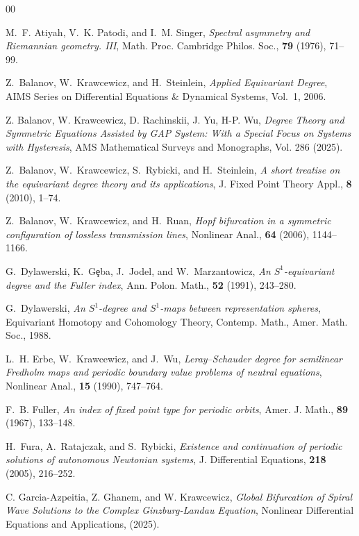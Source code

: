 \documentclass[twoside,11pt]{article}
\begin{document}
\begin{thebibliography}{00}

M.~F. Atiyah, V.~K. Patodi, and I.~M. Singer,
\emph{Spectral asymmetry and Riemannian geometry. III},
Math. Proc. Cambridge Philos. Soc., \textbf{79} (1976), 71--99.

Z.~Balanov, W.~Krawcewicz, and H.~Steinlein,
\emph{Applied Equivariant Degree},
AIMS Series on Differential Equations \& Dynamical Systems, Vol.~1, 2006.

 Z. Balanov, W. Krawcewicz,  D. Rachinskii, J. Yu, H-P. Wu, \emph{Degree Theory and Symmetric Equations Assisted by GAP System: With a Special Focus on Systems with Hysteresis}, AMS Mathematical Surveys and Monographs, Vol. 286 (2025).

Z.~Balanov, W.~Krawcewicz, S.~Rybicki, and H.~Steinlein, \emph{A short treatise on the equivariant degree theory and its applications},
J. Fixed Point Theory Appl., \textbf{8} (2010), 1--74.

Z.~Balanov, W.~Krawcewicz, and H.~Ruan,
\emph{Hopf bifurcation in a symmetric configuration of lossless transmission lines},
Nonlinear Anal., \textbf{64} (2006), 1144--1166.

G.~Dylawerski, K.~G\c{e}ba, J.~Jodel, and W.~Marzantowicz, \emph{An $S^1$-equivariant degree and the Fuller index},
Ann. Polon. Math., \textbf{52} (1991), 243--280.

G.~Dylawerski,
\emph{An $S^1$-degree and $S^1$-maps between representation spheres}, Equivariant Homotopy and Cohomology Theory, Contemp. Math., Amer. Math. Soc., 1988.

L.~H. Erbe, W.~Krawcewicz, and J.~Wu,
\emph{Leray--Schauder degree for semilinear Fredholm maps and periodic boundary value problems of neutral equations}, Nonlinear Anal., \textbf{15} (1990), 747--764.

F.~B. Fuller,
\emph{An index of fixed point type for periodic orbits}, Amer. J. Math., \textbf{89} (1967), 133--148.

H.~Fura, A.~Ratajczak, and S.~Rybicki,
\emph{Existence and continuation of periodic solutions of autonomous Newtonian systems},
J. Differential Equations, \textbf{218} (2005), 216--252.

C. Garcia-Azpeitia, Z. Ghanem, and W. Krawcewicz,
\emph{Global Bifurcation of Spiral Wave Solutions to the Complex Ginzburg-Landau Equation}, Nonlinear Differential Equations and Applications, (2025).


\end{thebibliography}
\end{document}
